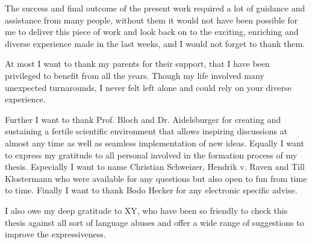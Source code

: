 
The success and final outcome of the present work required a lot of guidance
and assistance from many people, without them it would not have been possible
for me to deliver this piece of work and look back on to the exciting,
enriching and diverse experience made in the last weeks, and I would not
forget to thank them.

At most I want to thank my parents for their support, that I have been
privileged to benefit from all the years. Though my life involved many
unexpected turnarounds, I never felt left alone and could rely on your
diverse experience.

Further I want to thank Prof. Bloch and Dr. Aidelsburger for creating and
sustaining a fertile scientific environment that allows inspiring discussions
at almost any time as well as seamless implementation of new ideas. Equally I
want to express my gratitude to all personal involved in the formation process
of my thesis. Especially I want to name Christian Schweizer, Hendrik v. Raven
and Till Klostermann who were available for any questions but also open to
fun from time to time. Finally I want to thank Bodo Hecker for any electronic
specific advise.

I also owe my deep gratitude to XY, who have been so friendly to check this
thesis against all sort of language abuses and offer a wide range of
suggestions to improve the expressiveness.
